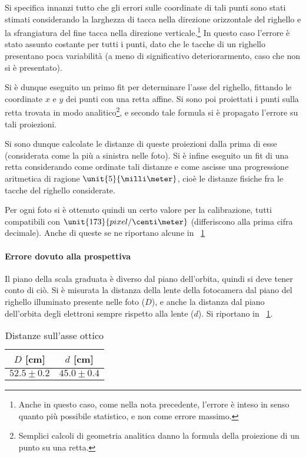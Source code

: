 \documentclass[10pt,a4paper]{article}
\begin{document}
Si specifica innanzi tutto che gli errori sulle coordinate di tali punti sono stati stimati considerando la larghezza di tacca nella direzione orizzontale del righello e la sfrangiatura del fine tacca nella direzione verticale.\footnote{Anche in questo caso, come nella nota precedente, l'errore è inteso in senso quanto più possibile statistico, e non come errore massimo.}
In questo caso l'errore è stato assunto costante per tutti i punti, dato che le tacche di un righello presentano poca variabilità (a meno di significativo deteriorarmento, caso che non si è presentato).

Si è dunque eseguito un primo fit per determinare l'asse del righello, fittando le coordinate $x$ e $y$ dei punti con una retta affine.
Si sono poi proiettati i punti sulla retta trovata in modo analitico\footnote{Semplici calcoli di geometria analitica danno la formula della proiezione di un punto su una retta.}, e secondo tale formula si è propagato l'errore su tali proiezioni.

Si sono dunque calcolate le distanze di queste proiezioni dalla prima di esse (considerata come la più a sinistra nelle foto). Si è infine eseguito un fit di una retta considerando come ordinate tali distanze e come ascisse una progressione aritmetica di ragione $\unit{5}{\milli\meter}$, cioè le distanze fisiche fra le tacche del righello considerate.

Per ogni foto si è ottenuto quindi un certo valore per la calibrazione, tutti compatibili con  $\unit{173}{pixel / \centi\meter}$ (differiscono alla prima cifra decimale). Anche di queste se ne riportano alcune in \tablename{~\ref{tab:somecal}}

\begin{figure}[H]
	\centering
	\resizebox{0.3\textwidth}{!}{
		}
	\label{tab:somecal}
\end{figure}


\paragraph{Errore dovuto alla prospettiva} Il piano della scala graduata è diverso dal piano dell'orbita, quindi si deve tener conto di ciò. Si è misurata la distanza della lente della fotocamera dal piano del righello illuminato presente nelle foto ($D$), e anche la distanza dal piano dell'orbita degli elettroni sempre rispetto alla lente ($d$).
Si riportano in \tablename{~\ref{tab:dist}}.
\begin{table}[H]
	\centering
	\begin{tabular}{c|c}
		$D$ [cm] & $d$ [cm]\\
		\hline
		$52.5 \pm 0.2$ & $45.0 \pm 0.4$\\
	\end{tabular}
	\caption{Distanze sull'asse ottico}
	\label{tab:dist}
\end{table}
\end{document}
